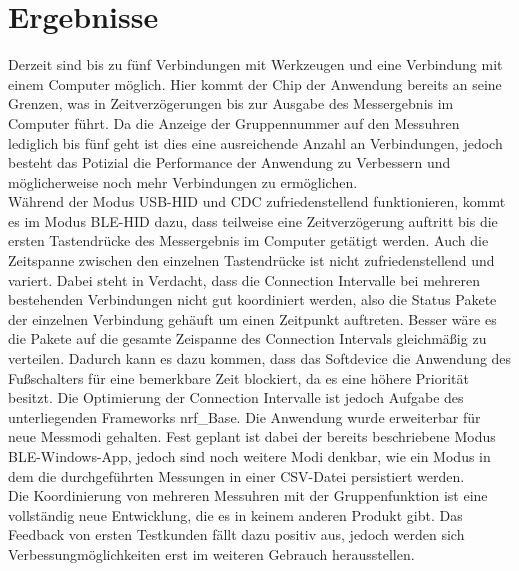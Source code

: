 \section{Ergebnisse}
Derzeit sind bis zu fünf Verbindungen mit Werkzeugen und eine Verbindung mit einem Computer möglich. Hier kommt der Chip der Anwendung bereits an seine Grenzen, was in Zeitverzögerungen bis zur Ausgabe des Messergebnis im Computer führt. Da die Anzeige der Gruppennummer auf den Messuhren lediglich bis fünf geht ist dies eine ausreichende Anzahl an Verbindungen, jedoch besteht das Potizial die Performance der Anwendung zu Verbessern und möglicherweise noch mehr Verbindungen zu ermöglichen.\\
Während der Modus \ac{USB}-\ac{HID} und \ac{CDC} zufriedenstellend funktionieren, kommt es im Modus \ac{BLE}-\ac{HID} dazu, dass teilweise eine Zeitverzögerung auftritt bis die ersten Tastendrücke des Messergebnis im Computer getätigt werden. Auch die Zeitspanne zwischen den einzelnen Tastendrücke ist nicht zufriedenstellend und variert. Dabei steht in Verdacht, dass die Connection Intervalle bei mehreren bestehenden Verbindungen nicht gut koordiniert werden, also die Status Pakete der einzelnen Verbindung gehäuft um einen Zeitpunkt auftreten. Besser wäre es die Pakete auf die gesamte Zeispanne des Connection Intervals gleichmäßig zu verteilen. Dadurch kann es dazu kommen, dass das Softdevice die Anwendung des Fußschalters für eine bemerkbare Zeit blockiert, da es eine höhere Priorität besitzt. Die Optimierung der Connection Intervalle ist jedoch Aufgabe des unterliegenden Frameworks nrf\_Base.
Die Anwendung wurde erweiterbar für neue Messmodi gehalten. Fest geplant ist dabei der bereits beschriebene Modus \ac{BLE}-Windows-App, jedoch sind noch weitere Modi denkbar, wie ein Modus in dem die durchgeführten Messungen in einer \ac{CSV}-Datei persistiert werden.\\
Die Koordinierung von mehreren Messuhren mit der Gruppenfunktion ist eine vollständig neue Entwicklung, die es in keinem anderen Produkt gibt. Das Feedback von ersten Testkunden fällt dazu positiv aus, jedoch werden sich Verbessungmöglichkeiten erst im weiteren Gebrauch herausstellen.\\
